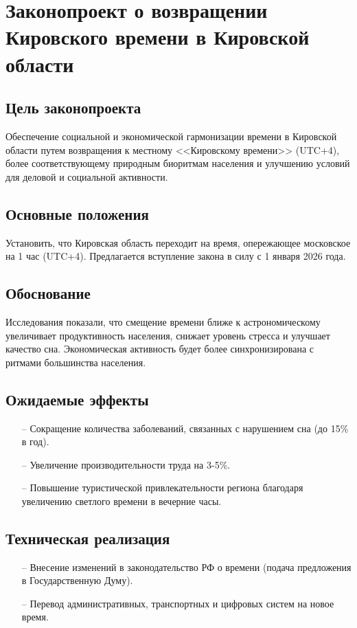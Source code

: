 \documentclass[a4paper,14pt]{extarticle}
\begin{document}
	\pagestyle{empty}
	\section*{Законопроект о возвращении\\ Кировского времени в Кировской области}
	
	\subsection*{Цель законопроекта}
	Обеспечение социальной и экономической гармонизации времени в Кировской области путем возвращения к местному <<Кировскому времени>> (UTC+4), более соответствующему природным биоритмам населения и улучшению условий для деловой и социальной активности.
	
	\subsection*{Основные положения}
	Установить, что Кировская область переходит на время, опережающее московское на 1 час (UTC+4).
	Предлагается вступление закона в силу с 1 января 2026 года.
	
	\subsection*{Обоснование}
	Исследования показали, что смещение времени ближе к астрономическому увеличивает продуктивность населения, снижает уровень стресса и улучшает качество сна.
	Экономическая активность будет более синхронизирована с ритмами большинства населения.
	
	\subsection*{Ожидаемые эффекты}
	\begin{itemize}
		\item[--] Сокращение количества заболеваний, связанных с нарушением сна (до 15\% в год).
		
		\item[--] Увеличение производительности труда на 3-5\%.
		
		\item[--] Повышение туристической привлекательности региона благодаря увеличению светлого времени в вечерние часы.
	\end{itemize}
	
	\subsection*{Техническая реализация}
		\begin{itemize}
		\item[--] Внесение изменений в законодательство РФ о времени (подача предложения в Государственную Думу).
		
		\item[--] Перевод административных, транспортных и цифровых систем на новое время.
	\end{itemize}
	
\end{document}
